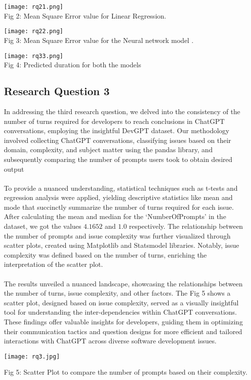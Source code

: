 \documentclass[journal]{IEEEtran}
\begin{document}
\begin{center}
     \texttt{[image: rq21.png]}\\
     \caption{Fig 2: Mean Square Error value for Linear Regression.}
\end{center}

\begin{center}
     \texttt{[image: rq22.png]}\\
     \caption{Fig 3: Mean Square Error value for the Neural network model .}
\end{center}

\begin{center}
     \texttt{[image: rq33.png]}\\
     \caption{Fig 4: Predicted duration for both the models}
\end{center}

\subsection{Research Question 3}
In addressing the third research question, we delved into the consistency of the number of turns required for developers to reach conclusions in ChatGPT conversations, employing the insightful DevGPT dataset. Our methodology involved collecting ChatGPT conversations, classifying issues based on their domain, complexity, and subject matter using the pandas library, and subsequently comparing the number of prompts users took to obtain desired output
 \\ \\
To provide a nuanced understanding, statistical techniques such as t-tests and regression analysis were applied, yielding descriptive statistics like mean and mode that succinctly summarize the number of turns required for each issue. After calculating the mean and median for the ‘NumberOfPrompts’ in the dataset, we got the values $4.1652$ and $1.0$ respectively. The relationship between the number of prompts and issue complexity was further visualized through scatter plots, created using Matplotlib and Statsmodel libraries. Notably, issue complexity was defined based on the number of turns, enriching the interpretation of the scatter plot.\\ \\
The results unveiled a nuanced landscape, showcasing the relationships between the number of turns, issue complexity, and other factors. The Fig 5 shows a scatter plot, designed based on issue complexity, served as a visually insightful tool for understanding the inter-dependencies within ChatGPT conversations. These findings offer valuable insights for developers, guiding them in optimizing their communication tactics and question designs for more efficient and tailored interactions with ChatGPT across diverse software development issues.
\begin{center}
     \texttt{[image: rq3.jpg]}
     \caption{Fig 5: Scatter Plot to compare the number of prompts based on their complexity.}
\end{center}
\end{document}
